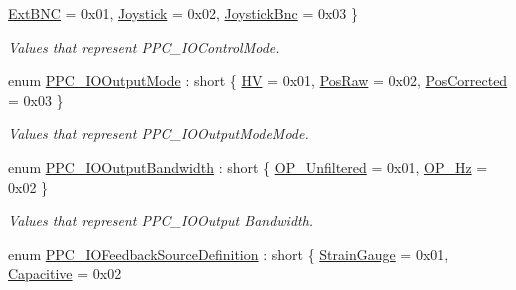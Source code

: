 \begin{DoxyCompactItemize}
\hyperlink{group___benchtop_precision_piezo_ggad49093cdbcb82112f991ef860e01c020a3e5d84ee0c64087f80c4639be737006c}{Ext\+B\+NC} = 0x01, 
\hyperlink{group___benchtop_precision_piezo_ggad49093cdbcb82112f991ef860e01c020a5ad0e1b6733f40ac1228c667f001ea4e}{Joystick} = 0x02, 
\hyperlink{group___benchtop_precision_piezo_ggad49093cdbcb82112f991ef860e01c020a13d6470783b8d9d98f8db5b1d70cc953}{Joystick\+Bnc} = 0x03
 \}\begin{DoxyCompactList}\small\item\em Values that represent P\+P\+C\+\_\+\+I\+O\+Control\+Mode. \end{DoxyCompactList}
\item 
enum \hyperlink{group___benchtop_precision_piezo_ga64728fb0465f2c9710369c2522d67c2e}{P\+P\+C\+\_\+\+I\+O\+Output\+Mode} \+: short \{ \hyperlink{group___benchtop_precision_piezo_gga64728fb0465f2c9710369c2522d67c2ea08fec6f15df66ecd6d2c3d81e404efc7}{HV} = 0x01, 
\hyperlink{group___benchtop_precision_piezo_gga64728fb0465f2c9710369c2522d67c2ead1d70a62e4b552187ce4774338c9c1df}{Pos\+Raw} = 0x02, 
\hyperlink{group___benchtop_precision_piezo_gga64728fb0465f2c9710369c2522d67c2ea4cc0178a395f884533270b5ef3c8bf66}{Pos\+Corrected} = 0x03
 \}\begin{DoxyCompactList}\small\item\em Values that represent P\+P\+C\+\_\+\+I\+O\+Output\+Mode\+Mode. \end{DoxyCompactList}
\item 
enum \hyperlink{group___benchtop_precision_piezo_gabb5be7fa1354d76f74e37d5dc67dc62b}{P\+P\+C\+\_\+\+I\+O\+Output\+Bandwidth} \+: short \{ \hyperlink{group___benchtop_precision_piezo_ggabb5be7fa1354d76f74e37d5dc67dc62ba42f9a80c5f009b9cbee71915534c8dc2}{O\+P\+\_\+\+Unfiltered} = 0x01, 
\hyperlink{group___benchtop_precision_piezo_ggabb5be7fa1354d76f74e37d5dc67dc62baf22894dddff75f825c4440df9beed475}{O\+P\+\_\+Hz} = 0x02
 \}\begin{DoxyCompactList}\small\item\em Values that represent P\+P\+C\+\_\+\+I\+O\+Output Bandwidth. \end{DoxyCompactList}
\item 
enum \hyperlink{group___benchtop_precision_piezo_ga72e3a198a9389d179464550e7ff6b115}{P\+P\+C\+\_\+\+I\+O\+Feedback\+Source\+Definition} \+: short \{ \hyperlink{group___benchtop_precision_piezo_gga72e3a198a9389d179464550e7ff6b115aa0a5e74b85de9331f6ce73d93f00680d}{Strain\+Gauge} = 0x01, 
\hyperlink{group___benchtop_precision_piezo_gga72e3a198a9389d179464550e7ff6b115a314ec3e995c0ef13f00fe43fae1e6d77}{Capacitive} = 0x02

\end{DoxyCompactItemize}
